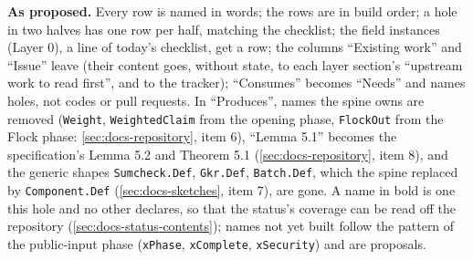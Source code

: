 \begin{sloppypar}
\textbf{As proposed.} Every row is named in words; the rows are in build order; a hole in two halves has one row per half, matching the checklist; the field instances (Layer 0), a line of today's checklist, get a row; the columns ``Existing work'' and ``Issue'' leave (their content goes, without state, to each layer section's ``upstream work to read first'', and to the tracker); ``Consumes'' becomes ``Needs'' and names holes, not codes or pull requests. In ``Produces'', names the spine owns are removed (\texttt{Weight}, \texttt{WeightedClaim} from the opening phase, \texttt{FlockOut} from the Flock phase: \cref{sec:docs-repository}, item 6), ``Lemma 5.1'' becomes the specification's Lemma 5.2 and Theorem 5.1 (\cref{sec:docs-repository}, item 8), and the generic shapes \texttt{Sumcheck.\allowbreak{}Def}, \texttt{Gkr.\allowbreak{}Def}, \texttt{Batch.\allowbreak{}Def}, which the spine replaced by \texttt{Component.\allowbreak{}Def} (\cref{sec:docs-sketches}, item 7), are gone. A name in bold is one this hole and no other declares, so that the status's coverage can be read off the repository (\cref{sec:docs-status-contents}); names not yet built follow the pattern of the public-input phase (\texttt{xPhase}, \texttt{xComplete}, \texttt{xSecurity}) and are proposals.
\end{sloppypar}

